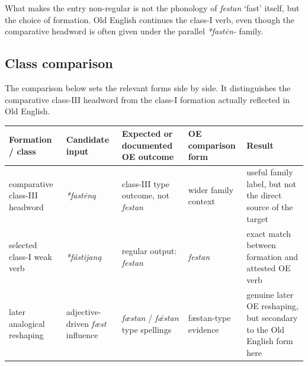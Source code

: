 \documentclass[
  british,
  a4paper,
  openany]{book}
\newcounter{none} %
\begin{document}
What makes the entry non-regular is not the phonology of {\emph{festan}}
`fast' itself, but the choice of formation. Old English continues the
class-I verb, even though the comparative headword is often given under
the parallel {\emph{*fastēn-}} family.

\subsection{Class comparison}\label{class-comparison}

The comparison below sets the relevant forms side by side. It
distinguishes the comparative class-III headword from the class-I
formation actually reflected in Old English.

{\def\LTcaptype{none} %
\begin{longtable}[]{@{}
  >{\raggedright\arraybackslash}p{}
  >{\raggedright\arraybackslash}p{}
  >{\raggedright\arraybackslash}p{}
  >{\raggedright\arraybackslash}p{}
  >{\raggedright\arraybackslash}p{}@{}}
\toprule\noalign{}
\begin{minipage}[b]{\linewidth}\raggedright
Formation / class
\end{minipage} & \begin{minipage}[b]{\linewidth}\raggedright
Candidate input
\end{minipage} & \begin{minipage}[b]{\linewidth}\raggedright
Expected or documented OE outcome
\end{minipage} & \begin{minipage}[b]{\linewidth}\raggedright
OE comparison form
\end{minipage} & \begin{minipage}[b]{\linewidth}\raggedright
Result
\end{minipage} \\
\midrule\noalign{}
\endhead
\bottomrule\noalign{}
\endlastfoot
comparative class-III headword & {\emph{*fastēną}} & class-III type
outcome, not {\emph{festan}} & wider family context & useful family
label, but not the direct source of the target \\
selected class-I weak verb & {\emph{*fástijaną}} & regular output:
{\emph{festan}} & {\emph{festan}} & exact match between formation and
attested OE verb \\
later analogical reshaping & adjective-driven {\emph{fæst}} influence &
{\emph{fæstan}} / {\emph{fǣstan}} type spellings & fæstan-type evidence
& genuine later OE reshaping, but secondary to the Old English form
here \\
\end{longtable}
}
\end{document}
